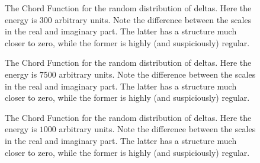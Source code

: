 \documentclass[a4paper,12pt]{article}
\begin{document}
\begin{figure}
\begin{center}
\caption{The Chord Function for the random distribution of deltas. 
Here the energy is $300$ arbitrary units. Note the difference between
the scales in the real and imaginary part. The latter has a structure much
closer to zero, while the former is highly (and suspiciously) regular.}
\label{XiFunction02}
\end{center}
\end{figure}




\begin{figure}
\begin{center}
\caption{The Chord Function for the random distribution of deltas. 
Here the energy is $7500$ arbitrary units. Note the difference between
the scales in the real and imaginary part. The latter has a structure much
closer to zero, while the former is highly (and suspiciously) regular.}
\label{XiFunction03}
\end{center}
\end{figure}




\begin{figure}
\begin{center}
\caption{The Chord Function for the random distribution of deltas. 
Here the energy is $1000$ arbitrary units. Note the difference between
the scales in the real and imaginary part. The latter has a structure much
closer to zero, while the former is highly (and suspiciously) regular.}
\label{XiFunction04}
\end{center}
\end{figure}
\end{document}
